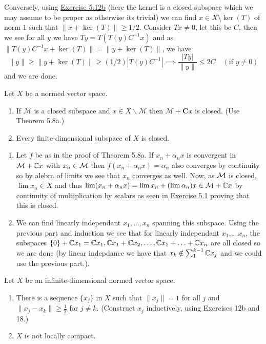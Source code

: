 \documentclass[12pt,a4paper]{article}
\begin{document}
Conversely, using \hyperref[prob:5-12]{Exercise 5.12b} (here the kernel is a closed subspace which we may assume to be proper as otherwise its trivial) we can find $x\in X\setminus\ker(T)$ of norm $1$ such that $\|x+\ker(T)\|\geq 1/2$. 
Consider $Tx\neq 0$, let this be $C$, then we see for all $y$ we have $Ty=T(T(y)C^{-1}x)$ and as $\|T(y)C^{-1}x+\ker(T)\|=\|y+\ker(T)\|$, we have 
\[
    \|y\|\geq\|y+\ker(T)\|\geq(1/2)|T(y)C^{-1}|\implies \frac{|Ty|}{\|y\|}\leq 2C\quad(\text{if }y\neq 0)
\]
and we are done. 
\begin{problem}\label{prob:5-18}
Let $X$ be a normed vector space.
\begin{enumerate}[label=\alph*.]
\item If $\mathcal{M}$ is a closed subspace and $x \in X \backslash \mathcal{M}$ then $\mathcal{M} + \mathbf{C}x$ is closed. (Use Theorem 5.8a.)
\item Every finite-dimensional subspace of $X$ is closed.
\end{enumerate}
\end{problem}
\begin{solution}
    \begin{enumerate}[label=\alph*.]
        \item Let $f$ be as in the proof of Theorem 5.8a. 
            If $x_n+\alpha_n x$ is convergent in $\mathcal{M}+\mathbb{C} x$ with $x_n\in\mathcal{M}$ then $f(x_n+\alpha_n x)=\alpha_n$ also converges by continuity so by alebra of limits we see that $x_n$ converges as well. 
            Now, as $\mathcal{M}$ is closed, $\lim x_n\in X$ and thus $\lim(x_n+\alpha_n x)=\lim x_n+(\lim\alpha_n)x\in\mathcal{M}+\mathbb{C} x$ by continuity of multiplication by scalars as seen in \hyperref[prob:5-1]{Exercise 5.1} proving that this is closed. 
        \item We can find linearly independant $x_1,\ldots,x_n$ spanning this subspace. 
            Using the previous part and induction we see that for linearly independant $x_1,\ldots x_n$, the subspaces $\{0\}+\mathbb{C} x_1=\mathbb{C} x_1,\mathbb{C} x_1+\mathbb{C} x_2,\ldots,\mathbb{C} x_1+\ldots+\mathbb{C} x_n$ are all closed so we are done (by linear indepdance we have that $x_k\notin\sum_1^{k-1}\mathbb{C} x_j$ and we could use the previous part.).  
    \end{enumerate}
\end{solution}
\begin{problem}\label{prob:5-19}
Let $X$ be an infinite-dimensional normed vector space.
\begin{enumerate}[label=\alph*.]
\item There is a sequence $\{x_j\}$ in $X$ such that $\|x_j\| = 1$ for all $j$ and $\|x_j - x_k\| \ge \frac{1}{2}$ for $j \ne k$. (Construct $x_j$ inductively, using Exercises 12b and 18.)
\item $X$ is not locally compact.
\end{enumerate}
\end{problem}
\end{document}
